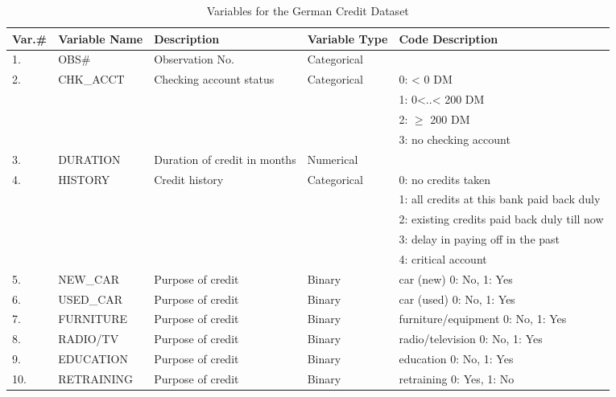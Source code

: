 \begin{table}
	\centering
	\caption{Variables for the German Credit Dataset \citep{shmueli}}
	\label{dataset}
	\begin{tabular}{|p{0.6cm}|p{2.6cm}|p{5cm}|p{2cm}|p{4.5cm}|}
	\hline
	\textbf{{\tiny Var.\#}}	& \textbf{{\tiny Variable Name}} & \textbf{{\tiny Description}} & \textbf{{\tiny Variable Type}} & \textbf{{\tiny Code Description }}\\ \hline
{\tiny 	1.}  & {\tiny OBS\#}  & {\tiny Observation No.}  & {\tiny Categorical}  &  \\ \hline
	{\tiny 2.}	& {\tiny CHK\_ACCT}  & {\tiny Checking account status}  & {\tiny Categorical}  & {\tiny 0: < 0 DM} \\
		&  &  &  & {\tiny 1: 0<..< 200 DM}  \\
		&  &  &  & {\tiny 2: $\geq$ 200 DM} \\
		&  &  &  & {\tiny 3: no checking account} \\ \hline
	{\tiny 3.}	& {\tiny DURATION} & {\tiny Duration of credit in months}  & {\tiny Numerical} &  \\ \hline
	{\tiny 4.}	& {\tiny HISTORY} & {\tiny Credit history} & {\tiny Categorical} & {\tiny 0: no credits taken} \\
		&  &  &  & {\tiny 1: all credits at this bank paid back duly }\\
		&  &  &  & {\tiny 2: existing credits paid back duly till now} \\
		&  &  &  & {\tiny 3: delay in paying off in the past} \\
		&  &  &  & {\tiny 4: critical account} \\ \hline
	{\tiny 5.}	& {\tiny NEW\_CAR } & {\tiny Purpose of credit} & {\tiny Binary} & {\tiny car (new) 0: No, 1: Yes} \\ \hline
	{\tiny 6.}	& {\tiny USED\_CAR} & {\tiny Purpose of credit} & {\tiny Binary} & {\tiny car (used) 0: No, 1: Yes} \\ \hline
	{\tiny 7.}	& {\tiny FURNITURE} & {\tiny Purpose of credit} & {\tiny Binary} & {\tiny furniture/equipment 0: No, 1: Yes} \\ \hline
	{\tiny 8.}	& {\tiny RADIO/TV}  & {\tiny Purpose of credit }& {\tiny Binary} & {\tiny radio/television 0: No, 1: Yes} \\ \hline
	{\tiny 9.}	& {\tiny EDUCATION} & {\tiny Purpose of credit} & {\tiny Binary} & {\tiny education 0: No, 1: Yes} \\ \hline
	{\tiny 10.}	& {\tiny RETRAINING}  & {\tiny Purpose of credit}  & {\tiny Binary} & {\tiny retraining 0: Yes, 1: No} \\ \hline

\end{tabular}
\end{table}
